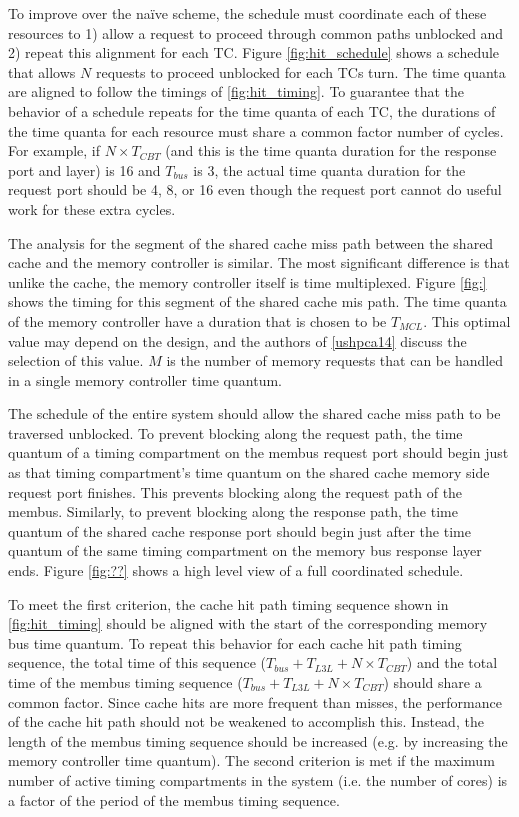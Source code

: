 To improve over the naïve scheme, the schedule must coordinate each of these 
resources to 1) allow a request to proceed through common paths unblocked and 
2) repeat this alignment for each TC. Figure \ref{fig:hit_schedule} shows a 
schedule that allows $N$ requests to proceed unblocked for each TCs turn. The 
time quanta are aligned to follow the timings of \ref{fig:hit_timing}. To 
guarantee that the behavior of a schedule repeats for the time quanta of each 
TC, the durations of the time quanta for each resource must share a common 
factor number of cycles. For example, if $N \times T_{CBT}$ (and this is the 
time quanta duration for the response port and layer) is 16 and $T_{bus}$ is 3, 
the actual time quanta duration for the request port should be 4, 8, or 16 even 
though the request port cannot do useful work for these extra cycles.

The analysis for the segment of the shared cache miss path between the shared 
cache and the memory controller is similar. The most significant difference is 
that unlike the cache, the memory controller itself is time multiplexed. Figure 
\ref{fig:} shows the timing for this segment of the shared cache mis path. The 
time quanta of the memory controller have a duration that is chosen to be 
$T_{MCL}$. This optimal value may depend on the design, and
the authors of \ref{ushpca14} discuss the selection of this value. $M$ is the 
number of memory requests that can be handled in a single memory controller 
time quantum.

The schedule of the entire system should allow the shared cache miss path to be 
traversed unblocked.
To prevent blocking along the request path, the time quantum of a timing 
compartment on the membus request port should begin just as that timing 
compartment's time quantum on the shared cache memory side request port 
finishes. This prevents blocking along the request path of the membus.
Similarly, to prevent blocking along the response path, the time quantum of the 
shared cache response port should begin just after the time quantum of the same 
timing compartment on the memory bus response layer ends. Figure \ref{fig:??} 
shows a high level view of a full coordinated schedule.

To meet the first criterion, the cache hit path timing sequence shown in 
\ref{fig:hit_timing} should be aligned with the start of the corresponding 
memory bus time quantum. To repeat this behavior for each cache hit path timing 
sequence, the total time of this sequence ($T_{bus}+T_{L3L}+N\times T_{CBT}$)
and the total time of the membus timing sequence
($T_{bus}+T_{L3L}+N\times T_{CBT}$) should share a common factor. Since cache 
hits are more frequent than misses, the performance of the cache hit path 
should not be weakened to accomplish this. Instead, the length of the membus 
timing sequence should be increased (e.g. by increasing the memory controller 
time quantum). 
The second criterion is met if the maximum number of active timing compartments 
in the system (i.e. the number of cores) is a factor of the period of the 
membus timing sequence.
